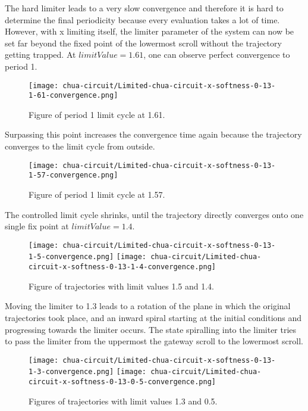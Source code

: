 \documentclass[main]{subfiles}
\begin{document}
The hard limiter leads to a very slow convergence and therefore it is hard to determine the final periodicity because every evaluation takes a lot of time. %
%
However, with x limiting itself, the limiter parameter of the system can now be set far beyond the fixed point of the lowermost scroll without the trajectory getting trapped. %
%
At \(limitValue=1.61\), one can observe perfect convergence to period 1.

\begin{figure}[H]
\centering
\texttt{[image: chua-circuit/Limited-chua-circuit-x-softness-0-13-1-61-convergence.png]}
\caption[Figure of period 1 limit cycle]{Figure of period 1 limit cycle at 1.61.}
\label{figure:x-0.13-fast-1-limit-cycle-trajectory-1-61}
\end{figure}

Surpassing this point increases the convergence time again because the trajectory converges to the limit cycle from outside.

\begin{figure}[H]
\centering
\texttt{[image: chua-circuit/Limited-chua-circuit-x-softness-0-13-1-57-convergence.png]}
\caption[Figure of period another 1 limit cycle]{Figure of period 1 limit cycle at 1.57.}
\label{figure:x-0.13-fast-1-limit-cycle-trajectory-1-57}
\end{figure}

The controlled limit cycle shrinks, until the trajectory directly converges onto one single fix point at \(limitValue=1.4\). 

\begin{figure}[H]
\centering
\texttt{[image: chua-circuit/Limited-chua-circuit-x-softness-0-13-1-5-convergence.png]}
\texttt{[image: chua-circuit/Limited-chua-circuit-x-softness-0-13-1-4-convergence.png]}
\caption[Figure of fix point convergence]{Figure of trajectories with limit values 1.5 and 1.4.}
\label{figure:x-0.13-convergence-trajectories}
\end{figure}

Moving the limiter to 1.3 leads to a rotation of the plane in which the original trajectories took place, and an inward spiral starting at the initial conditions and progressing towards the limiter occurs. %
%
The state spiralling into the limiter tries to pass the limiter from the uppermost the gateway scroll to the lowermost scroll.

\begin{figure}[H]
\centering
\texttt{[image: chua-circuit/Limited-chua-circuit-x-softness-0-13-1-3-convergence.png]}
\texttt{[image: chua-circuit/Limited-chua-circuit-x-softness-0-13-0-5-convergence.png]}
\caption[Figure of period 1 limit cycle]{Figures of trajectories with limit values 1.3 and 0.5.}
\label{figure:x-0.13-spiral-trajectories}
\end{figure}
\end{document}

